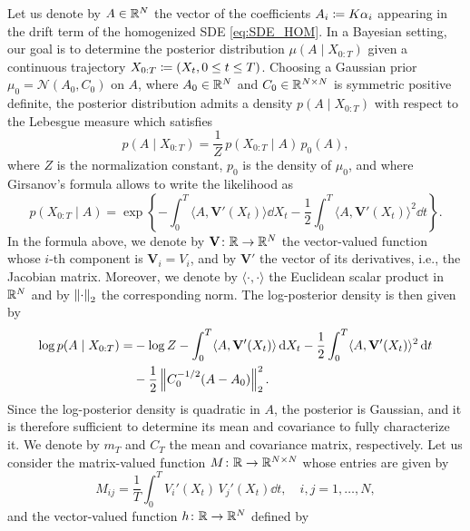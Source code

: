 \documentclass[10pt]{article}
\begin{document}
Let us denote by $A \in \mathbb{R}^N$ the vector of the coefficients $A_i \coloneqq K \alpha_i$ appearing in the drift term of the homogenized SDE \eqref{eq:SDE_HOM}. In a Bayesian setting, our goal is to determine the posterior distribution $\mu(A \mid X_{0:T})$ given a continuous trajectory $X_{0:T} \coloneqq (X_t, 0 \leq t \leq T)$. Choosing a Gaussian prior $\mu_0 = \mathcal N(A_0, C_0)$ on $A$, where $A_0 \in \mathbb{R}^N$ and $C_0 \in \mathbb{R}^{N\times N}$ is symmetric positive definite, the posterior distribution admits a density $p(A \mid X_{0:T})$ with respect to the Lebesgue measure which satisfies
\begin{equation}
	p(A \mid X_{0:T}) = \frac1Z \, p(X_{0:T} \mid A) \, p_0(A),
\end{equation}
where $Z$ is the normalization constant, $p_0$ is the density of $\mu_0$, and where Girsanov's formula allows to write the likelihood as
\begin{equation}
	p(X_{0:T} \mid A) = \exp\left\{-\int_0^T \langle A, \mathbf V'(X_t)\rangle \dd X_t - \frac12 \int_0^T \langle A, \mathbf V'(X_t) \rangle^2 \dd t \right\}.
\end{equation}
In the formula above, we denote by $\mathbf V \colon \mathbb{R} \to \mathbb{R}^N$ the vector-valued function whose $i$-th component is $\mathbf V_i = V_i$, and by $\mathbf V'$ the vector of its derivatives, i.e., the Jacobian matrix. Moreover, we denote by $\langle \cdot, \cdot \rangle$ the Euclidean scalar product in $\mathbb{R}^N$ and by $\left\|\cdot\right\|_2$ the corresponding norm. The log-posterior density is then given by
\begin{equation}
\begin{aligned}
	\log p(A \mid X_{0:T}) = &-\log Z -\int_0^T \langle A, \mathbf V'(X_t)\rangle \,\mathrm{d} X_t - \frac12 \int_0^T \langle A, \mathbf V'(X_t) \rangle^2 \,\mathrm{d} t \\
	&- \frac12 \left\|C_0^{-1/2}(A - A_0)\right\|_2^2.
\end{aligned}
\end{equation}
Since the log-posterior density is quadratic in $A$, the posterior is Gaussian, and it is therefore sufficient to determine its mean and covariance to fully characterize it. We denote by $m_T$ and $C_T$ the mean and covariance matrix, respectively. Let us consider the matrix-valued function $M \colon \mathbb{R} \to \mathbb{R}^{N\times N}$ whose entries are given by
\begin{equation}
	M_{ij} = \frac1T \int_0^T V_i'(X_t) \, V_j'(X_t) \dd t, \quad i, j = 1, \ldots, N,
\end{equation}
and the vector-valued function $h \colon \mathbb{R} \to \mathbb{R}^N$ defined by
\end{document}
